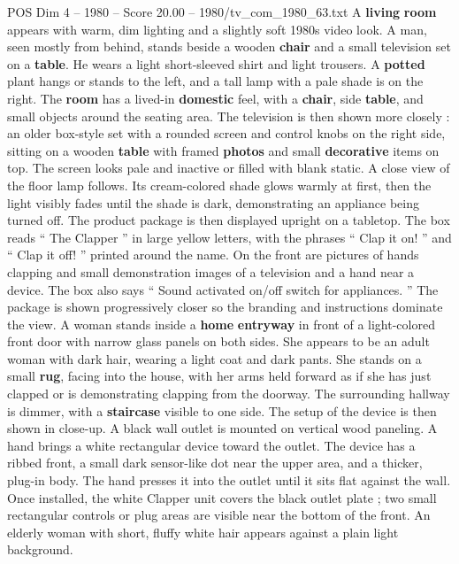 \begin{textsample}{POS Dim 4 – 1980 – Score 20.00 – 1980/tv\_com\_1980\_63.txt}  \label{ex:f4_pos_042}
A \textbf{living} \textbf{room} appears with warm, dim lighting and a slightly soft 1980s video look.
A man, seen mostly from behind, stands beside a wooden \textbf{chair} and a small television set on a \textbf{table}.
He wears a light short-sleeved shirt and light trousers.
A \textbf{potted} plant hangs or stands to the left, and a tall lamp with a pale shade is on the right.
The \textbf{room} has a lived-in \textbf{domestic} feel, with a \textbf{chair}, side \textbf{table}, and small objects around the seating area.
The television is then shown more closely : an older box-style set with a rounded screen and control knobs on the right side, sitting on a wooden \textbf{table} with framed \textbf{photos} and small \textbf{decorative} items on top.
The screen looks pale and inactive or filled with blank static.
A close view of the floor lamp follows.
Its cream-colored shade glows warmly at first, then the light visibly fades until the shade is dark, demonstrating an appliance being turned off.
The product package is then displayed upright on a tabletop.
The box reads “ The Clapper ” in large yellow letters, with the phrases “ Clap it on! ” and “ Clap it off! ” printed around the name.
On the front are pictures of hands clapping and small demonstration images of a television and a hand near a device.
The box also says “ Sound activated on/off switch for appliances. ” The package is shown progressively closer so the branding and instructions dominate the view.
A woman stands inside a \textbf{home} \textbf{entryway} in front of a light-colored front door with narrow glass panels on both sides.
She appears to be an adult woman with dark hair, wearing a light coat and dark pants.
She stands on a small \textbf{rug}, facing into the house, with her arms held forward as if she has just clapped or is demonstrating clapping from the doorway.
The surrounding hallway is dimmer, with a \textbf{staircase} visible to one side.
The setup of the device is then shown in close-up.
A black wall outlet is mounted on vertical wood paneling.
A hand brings a white rectangular device toward the outlet.
The device has a ribbed front, a small dark sensor-like dot near the upper area, and a thicker, plug-in body.
The hand presses it into the outlet until it sits flat against the wall.
Once installed, the white Clapper unit covers the black outlet plate ; two small rectangular controls or plug areas are visible near the bottom of the front.
An elderly woman with short, fluffy white hair appears against a plain light background.

\end{textsample}

